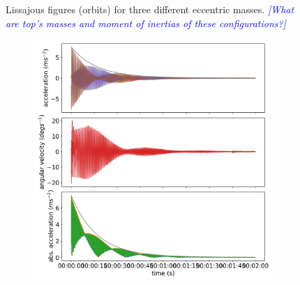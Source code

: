 \documentclass{article}
\newcommand{\andy}[1]{\textcolor{blue}{\emph{#1}}}
\begin{document}
\begin{figure}[ht]
\begin{subfigure}[b]{0.45\textwidth}
        \caption{}
        \label{fig:low-mass:orbit}
    \end{subfigure}
    
    \caption{Lissajous figures (orbits) for three different eccentric masses. \andy{[What are top's masses and moment of inertias of these configurations?]}}
    \label{fig:low-mass}
\end{figure}


\begin{figure}

    \centering
    \begin{subfigure}[b]{0.45\textwidth}
        \centering
        \includegraphics[width=\textwidth]{results/experiment/medium_mass_acceleration.png}
        \caption{}
        \label{fig:medium-mass:acc}
    \end{subfigure}
    \begin{subfigure}[b]{0.45\textwidth}
        \centering

\end{subfigure}
\end{figure}
\end{document}

